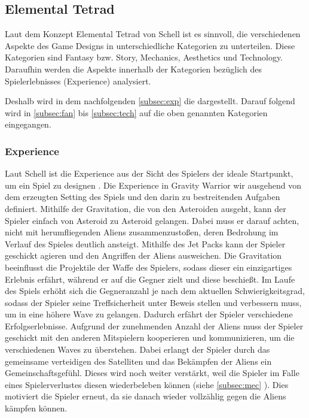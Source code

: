\documentclass[11pt]{scrartcl}
\begin{document}
\subsection{Elemental Tetrad}
Laut dem Konzept Elemental Tetrad von Schell\cite[~p.41]{S2014} ist es sinnvoll, die verschiedenen Aspekte des Game Designs in unterschiedliche Kategorien zu unterteilen. Diese Kategorien sind Fantasy bzw. Story, Mechanics, Aesthetics und Technology. Daraufhin werden die Aspekte innerhalb der Kategorien bezüglich des Spielerlebnisses (Experience) analysiert.

Deshalb wird in dem nachfolgenden \autoref{subsec:exp} die  dargestellt. Darauf folgend wird in \ref{subsec:fan} bis \ref{subsec:tech} auf die oben genannten Kategorien eingegangen.

\subsubsection{Experience}
\label{subsec:exp}
Laut Schell ist die Experience aus der Sicht des Spielers der ideale Startpunkt, um ein Spiel zu designen \cite[~p. xxiii]{S2014}. Die Experience in Gravity Warrior wir ausgehend von dem erzeugten Setting des Spiels und den darin zu bestreitenden Aufgaben definiert. Mithilfe der Gravitation, die von den Asteroiden ausgeht, kann der Spieler einfach von Asteroid zu Asteroid gelangen. Dabei muss er darauf achten, nicht mit herumfliegenden Aliens zusammenzustoßen, deren Bedrohung im Verlauf des Spieles deutlich ansteigt. Mithilfe des Jet Packs kann der Spieler geschickt agieren und den Angriffen der Aliens ausweichen. Die Gravitation beeinflusst die Projektile der Waffe des Spielers, sodass dieser ein einzigartiges Erlebnis erfährt, während er auf die Gegner zielt und diese beschießt. Im Laufe des Spiels erhöht sich die Gegneranzahl je nach dem aktuellen Schwierigkeitsgrad, sodass der Spieler seine Treffsicherheit unter Beweis stellen und verbessern muss, um in eine höhere Wave zu gelangen. Dadurch erfährt der Spieler verschiedene Erfolgserlebnisse. 
Aufgrund der zunehmenden Anzahl der Aliens muss der Spieler geschickt mit den anderen Mitspielern kooperieren und kommunizieren, um die verschiedenen Waves zu überstehen. Dabei erlangt der Spieler durch das gemeinsame verteidigen des Satelliten und das Bekämpfen der Aliens ein Gemeinschaftsgefühl. Dieses wird noch weiter verstärkt, weil die Spieler im Falle eines Spielerverlustes diesen wiederbeleben können (siehe \autoref{subsec:mec} ). Dies motiviert die Spieler erneut, da sie danach wieder vollzählig gegen die Aliens kämpfen können. 
\end{document}
